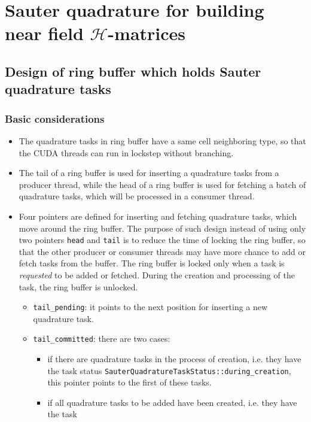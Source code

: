 \documentclass[11pt, a4paper]{book}
\begin{document}
\section{Sauter quadrature for building near field $\mathcal{H}$-matrices}

\subsection{Design of ring buffer which holds Sauter quadrature tasks}

\subsubsection{Basic considerations}

\begin{itemize}
\item The quadrature tasks in ring buffer have a same cell neighboring type, so that the
  CUDA threads can run in lockstep without branching.
\item The tail of a ring buffer is used for inserting a quadrature tasks from a producer
  thread, while the head of a ring buffer is used for fetching a batch of quadrature
  tasks, which will be processed in a consumer thread.
\item Four pointers are defined for inserting and fetching quadrature tasks, which move
  around the ring buffer. The purpose of such design instead of using only two pointers
  \texttt{head} and \texttt{tail} is to reduce the time of locking the ring buffer, so
  that the other producer or consumer threads may have more chance to add or fetch tasks
  from the buffer. The ring buffer is locked only when a task is \emph{requested} to be
  added or fetched. During the creation and processing of the task, the ring buffer is
  unlocked.
  \begin{itemize}
  \item \texttt{tail\_pending}: it points to the next position for inserting a new
    quadrature task.
  \item \texttt{tail\_committed}: there are two cases:
    \begin{itemize}
    \item if there are quadrature tasks in the process of creation, i.e. they have the
      task status \texttt{SauterQuadratureTaskStatus::during\_creation}, this pointer
      points to the first of these tasks.
    \item if all quadrature tasks to be added have been created, i.e. they have the task

\end{itemize}
\end{itemize}
\end{itemize}
\end{document}
